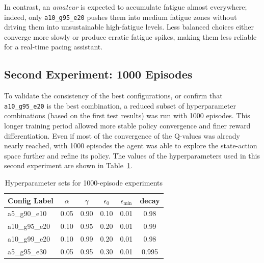 In contrast, an \textit{amateur} is expected to accumulate fatigue almost everywhere; indeed, only \texttt{a10\_g95\_e20} pushes them into medium fatigue zones without driving them into unsustainable high-fatigue levels. Less balanced choices either converge more slowly or produce erratic fatigue spikes, making them less reliable for a real-time pacing assistant.

\subsection{Second Experiment: 1000 Episodes}

To validate the consistency of the best configurations, or confirm that \texttt{a10\_g95\_e20} is the best combination, a reduced subset of hyperparameter combinations (based on the first test results) was run with 1000 episodes. 
This longer training period allowed more stable policy convergence and finer reward differentiation. 
Even if most of the convergence of the Q-values was already nearly reached, with 1000 episodes the agent was able to explore the state-action space further and refine its policy. 
The values of the hyperparameters used in this second experiment are shown in Table~\ref{tab:hp-1000}.

\begin{table}[h!]
  \centering
  \begin{tabular}{l c c c c c}
    \toprule
    \textbf{Config Label} & $\alpha$ & $\gamma$ & $\epsilon_0$ & $\epsilon_{\min}$ & \textbf{decay} \\
    \midrule
    a5\_g90\_e10   & 0.05 & 0.90 & 0.10 & 0.01 & 0.98  \\
    a10\_g95\_e20  & 0.10 & 0.95 & 0.20 & 0.01 & 0.99  \\
    a10\_g99\_e20  & 0.10 & 0.99 & 0.20 & 0.01 & 0.98  \\
    a5\_g95\_e30   & 0.05 & 0.95 & 0.30 & 0.01 & 0.995 \\
    \bottomrule
  \end{tabular}
  \caption{Hyperparameter sets for 1000-episode experiments}
  \label{tab:hp-1000}
\end{table}

